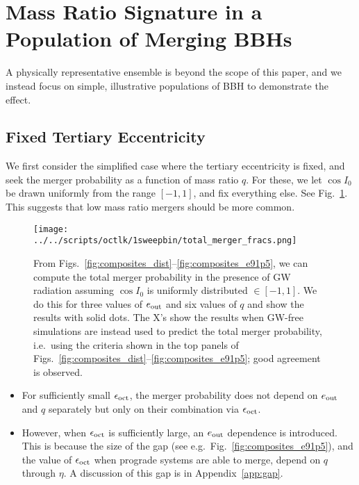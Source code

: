 \documentclass[
        fleqn,
        usenatbib,
    ]{mnras}
\begin{document}
\section{Mass Ratio Signature in a Population of Merging BBHs}

A physically representative ensemble is beyond the scope of this paper, and we
instead focus on simple, illustrative populations of BBH to demonstrate the
effect.

\subsection{Fixed Tertiary Eccentricity}

We first consider the simplified case where the tertiary eccentricity is fixed,
and seek the merger probability as a function of mass ratio $q$. For these, we
let $\cos I_0$ be drawn uniformly from the range $[-1, 1]$, and fix everything
else. See Fig.~\ref{fig:total_merger_fracs}. This suggests that low mass ratio
mergers should be more common.
\begin{figure*}
    \centering
    \texttt{[image: ../../scripts/octlk/1sweepbin/total\_merger\_fracs.png]}
    \caption{From Figs.~\ref{fig:composites_dist}--\ref{fig:composites_e91p5},
    we can compute the total merger probability in the presence of GW radiation
    assuming $\cos I_0$ is uniformly distributed $\in [-1, 1]$. We do this for
    three values of $e_{\rm out}$ and six values of $q$ and show the results
    with solid dots. The X's show the results when GW-free simulations are
    instead used to predict the total merger probability, i.e.\ using the
    criteria shown in the top panels of
    Figs.~\ref{fig:composites_dist}--\ref{fig:composites_e91p5}; good agreement
    is observed. }\label{fig:total_merger_fracs}
\end{figure*}
\begin{itemize}
    \item For sufficiently small $\epsilon_{\rm oct}$, the merger probability
        does not depend on $e_{\rm out}$ and $q$ separately but only on their
        combination via $\epsilon_{\rm oct}$.

    \item However, when $\epsilon_{\rm oct}$ is sufficiently large, an $e_{\rm
        out}$ dependence is introduced. This is because the size of the gap (see
        e.g.\ Fig.~\ref{fig:composites_e91p5}), and the value of $\epsilon_{\rm
        oct}$ when prograde systems are able to merge, depend on $q$ through
        $\eta$. A discussion of this gap is in Appendix~\ref{app:gap}.
\end{itemize}
\end{document}
